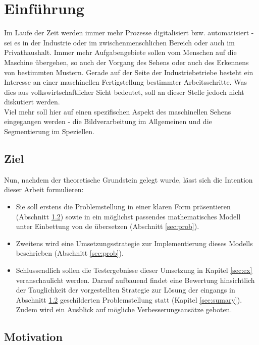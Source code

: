 
\chapter{Einführung}
\label{sec:intro}
	
	Im Laufe der Zeit werden immer mehr Prozesse digitalisiert bzw. 
	automatisiert - sei es in der Industrie oder im zwischenmenschlichen 
	Bereich oder auch im Privathaushalt. Immer mehr Aufgabengebiete sollen vom 
	Menschen auf die Maschine übergehen, so auch der Vorgang des Sehens oder 
	auch des Erkennens von bestimmten Mustern. Gerade auf der Seite der 
	Industriebetriebe besteht ein Interesse an einer maschinellen 
	Fertigstellung bestimmter Arbeitsschritte. Was dies aus 
	volkswirtschaftlicher Sicht bedeutet, soll an dieser Stelle jedoch nicht 
	diskutiert werden. \\
	Viel mehr soll hier auf einen spezifischen Aspekt des maschinellen Sehens 
	eingegangen werden - die Bildverarbeitung im Allgemeinen und die 
	Segmentierung im Speziellen.
	
	\section{Ziel}
	\label{sec:ziel}
	
		Nun, nachdem der theoretische Grundstein gelegt wurde, lässt sich die Intention dieser Arbeit formulieren:
		\begin{itemize}
			\item Sie soll erstens die Problemstellung in einer klaren Form präsentieren (Abschnitt \ref{sec:motivation}) sowie in ein möglichst passendes mathematisches Modell unter Einbettung von \gls{de} übersetzen (Abschnitt \ref{sec:prob}).
			\item Zweitens wird eine Umsetzungsstrategie zur Implementierung dieses Modells beschrieben (Abschnitt \ref{sec:prob}).
			\item Schlussendlich sollen die Testergebnisse dieser Umsetzung in Kapitel \ref{sec:ex} veranschaulicht werden. Darauf aufbauend findet eine Bewertung hinsichtlich der Tauglichkeit der vorgestellten Strategie zur Lösung der eingangs in Abschnitt \ref{sec:motivation} geschilderten Problemstellung statt (Kapitel \ref{sec:sumary}). Zudem wird ein Ausblick auf mögliche Verbesserungsansätze geboten. 
		\end{itemize}
	
	\section{Motivation}
	\label{sec:motivation}